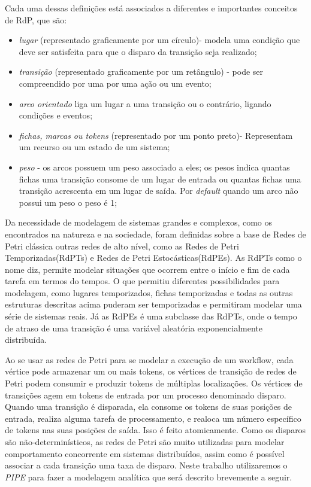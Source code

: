 		Cada uma dessas definições está associados a diferentes e importantes conceitos de RdP, que são:
		
			\begin{itemize}

				\item \textit{lugar} (representado graficamente por um círculo)- modela uma condição que deve ser satisfeita para que o disparo da transição seja realizado;

				\item \textit{transição} (representado graficamente por um retângulo) - pode ser compreendido por uma por uma ação ou um evento;

				\item \textit{arco orientado} liga um lugar a uma transição ou o contrário, ligando condições e eventos;

				\item \textit{fichas, marcas ou tokens} (representado por um ponto preto)- Representam um recurso ou um estado de um sistema;

				\item \textit{peso} - os arcos possuem um peso associado a eles; os pesos indica quantas fichas uma transição consome de um lugar de entrada ou quantas fichas uma transição acrescenta em um lugar de saída. Por \textit{default} quando um arco não possui um peso o peso é 1;
					
			\end{itemize}
			
			Da necessidade de modelagem de sistemas grandes e complexos, como os encontrados na natureza e na sociedade, foram definidas sobre a base de Redes de Petri clássica outras redes de alto nível, como as Redes de Petri Temporizadas(RdPTs) e Redes de Petri Estocásticas(RdPEs). As RdPTs como o nome diz, permite modelar situações que ocorrem entre o início e fim de cada tarefa em termos do tempos. O que permitiu diferentes possibilidades para modelagem, como lugares temporizados, fichas temporizadas e todas as outras estruturas descritas acima puderam ser temporizadas e permitiram modelar uma série de sistemas reais. Já as RdPEs é uma subclasse das RdPTs, onde o tempo de atraso de uma transição é uma variável aleatória exponencialmente distribuída\cite{Braghetto2011}. 
		
			Ao se usar as redes de Petri para se modelar a execução de um workflow, cada vértice pode armazenar um ou mais tokens, os vértices de transição de redes de Petri podem consumir e produzir tokens de múltiplas localizações. Os vértices de transições agem em tokens de entrada por um processo denominado disparo. Quando uma transição é disparada, ela consome os tokens de suas posições de entrada, realiza alguma tarefa de processamento, e realoca um número específico de tokens nas suas posições de saída. Isso é feito atomicamente. Como os disparos são não-determinísticos, as redes de Petri são muito utilizadas para modelar comportamento concorrente em sistemas distribuídos\cite{Ogasawara2011}, assim como é possível associar a cada transição uma taxa de disparo. Neste trabalho utilizaremos o \textit{PIPE} para fazer a modelagem analítica que será descrito brevemente a seguir. 
					
